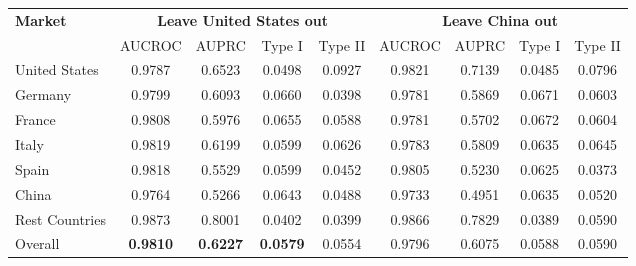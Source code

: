 \documentclass[11pt,english]{article}
\begin{document}
\begin{table}[t]
{\begin{tabular}{l|cccc|cccc}
        \multirow{2}{*}{\textbf{Market}} 
        & \multicolumn{4}{c|}{\textbf{Leave United States out}} 
        & \multicolumn{4}{c}{\textbf{Leave China out}} \\
        \cline{2-9}
         & AUCROC & AUPRC & Type I & Type II
         & AUCROC & AUPRC & Type I & Type II \\
        \hline
        United States  & 0.9787 & 0.6523 & 0.0498 & 0.0927 & 0.9821 & 0.7139 & 0.0485 & 0.0796 \\
        Germany        & 0.9799 & 0.6093 & 0.0660 & 0.0398 & 0.9781 & 0.5869 & 0.0671 & 0.0603 \\
        France         & 0.9808 & 0.5976 & 0.0655 & 0.0588 & 0.9781 & 0.5702 & 0.0672 & 0.0604 \\
        Italy          & 0.9819 & 0.6199 & 0.0599 & 0.0626 & 0.9783 & 0.5809 & 0.0635 & 0.0645 \\
        Spain          & 0.9818 & 0.5529 & 0.0599 & 0.0452 & 0.9805 & 0.5230 & 0.0625 & 0.0373 \\
        China          & 0.9764 & 0.5266 & 0.0643 & 0.0488 & 0.9733 & 0.4951 & 0.0635 & 0.0520 \\
        Rest Countries & 0.9873 & 0.8001 & 0.0402 & 0.0399 & 0.9866 & 0.7829 & 0.0389 & 0.0590 \\
        \hline
        Overall        & \textbf{0.9810} & \textbf{0.6227} & \textbf{0.0579} & 0.0554 & 0.9796 & 0.6075 & 0.0588 & 0.0590 \\
        \hline
    \end{tabular}}
    \label{tab:leave_one_country_out}
\end{table}
\end{document}

